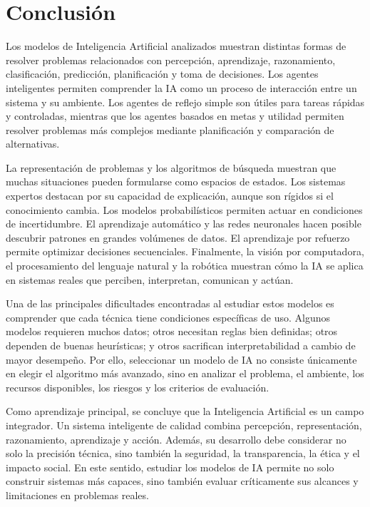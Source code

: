 \section{Conclusión}

Los modelos de Inteligencia Artificial analizados muestran distintas formas de resolver problemas relacionados con percepción, aprendizaje, razonamiento, clasificación, predicción, planificación y toma de decisiones. Los agentes inteligentes permiten comprender la IA como un proceso de interacción entre un sistema y su ambiente. Los agentes de reflejo simple son útiles para tareas rápidas y controladas, mientras que los agentes basados en metas y utilidad permiten resolver problemas más complejos mediante planificación y comparación de alternativas.

La representación de problemas y los algoritmos de búsqueda muestran que muchas situaciones pueden formularse como espacios de estados. Los sistemas expertos destacan por su capacidad de explicación, aunque son rígidos si el conocimiento cambia. Los modelos probabilísticos permiten actuar en condiciones de incertidumbre. El aprendizaje automático y las redes neuronales hacen posible descubrir patrones en grandes volúmenes de datos. El aprendizaje por refuerzo permite optimizar decisiones secuenciales. Finalmente, la visión por computadora, el procesamiento del lenguaje natural y la robótica muestran cómo la IA se aplica en sistemas reales que perciben, interpretan, comunican y actúan.

Una de las principales dificultades encontradas al estudiar estos modelos es comprender que cada técnica tiene condiciones específicas de uso. Algunos modelos requieren muchos datos; otros necesitan reglas bien definidas; otros dependen de buenas heurísticas; y otros sacrifican interpretabilidad a cambio de mayor desempeño. Por ello, seleccionar un modelo de IA no consiste únicamente en elegir el algoritmo más avanzado, sino en analizar el problema, el ambiente, los recursos disponibles, los riesgos y los criterios de evaluación.

Como aprendizaje principal, se concluye que la Inteligencia Artificial es un campo integrador. Un sistema inteligente de calidad combina percepción, representación, razonamiento, aprendizaje y acción. Además, su desarrollo debe considerar no solo la precisión técnica, sino también la seguridad, la transparencia, la ética y el impacto social. En este sentido, estudiar los modelos de IA permite no solo construir sistemas más capaces, sino también evaluar críticamente sus alcances y limitaciones en problemas reales.

